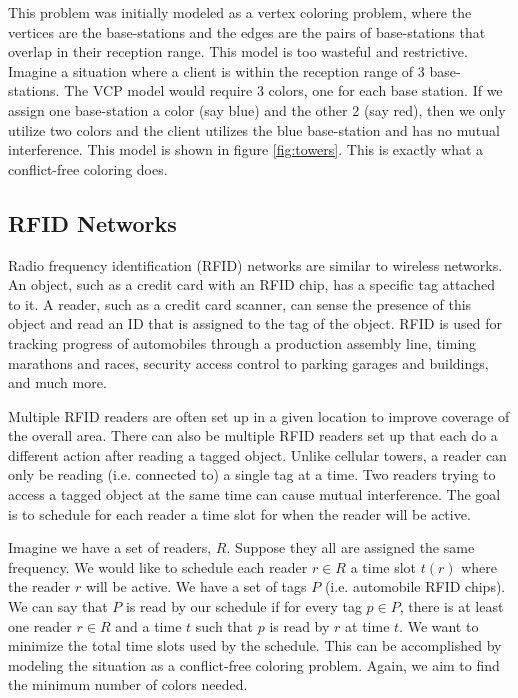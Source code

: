 \documentclass{sig-alternate}
\begin{document}
This problem was initially modeled as a vertex coloring problem, where the vertices are the base-stations and the edges are the pairs of base-stations that overlap in their reception range. This model is too wasteful and restrictive. Imagine a situation where a client is within the reception range of 3 base-stations. The VCP model would require 3 colors, one for each base station. If we assign one base-station a color (say blue) and the other 2 (say red), then we only utilize two colors and the client utilizes the blue base-station and has no mutual interference. This model is shown in figure \ref{fig:towers}. This is exactly what a conflict-free coloring does. \cite{smorodinsky2013conflict}

\subsection{RFID Networks}
Radio frequency identification (RFID) networks are similar to wireless networks. An object, such as a credit card with an RFID chip, has a specific tag attached to it. A reader, such as a credit card scanner, can sense the presence of this object and read an ID that is assigned to the tag of the object. RFID is used for tracking progress of automobiles through a production assembly line, timing marathons and races, security access control to parking garages and buildings, and much more.

Multiple RFID readers are often set up in a given location to improve coverage of the overall area. There can also be multiple RFID readers set up that each do a different action after reading a tagged object. Unlike cellular towers, a reader can only be reading (i.e. connected to) a single tag at a time. Two readers trying to access a tagged object at the same time can cause mutual interference. The goal is to schedule for each reader a time slot for when the reader will be active.

Imagine we have a set of readers, $R$. Suppose they all are assigned the same frequency. We would like to schedule each reader $r \in R$ a time slot $t(r)$ where the reader $r$ will be active. We have a set of tags $P$ (i.e. automobile RFID chips). We can say that $P$ is read by our schedule if for every tag $p \in P$, there is at least one reader $r \in R$ and a time $t$ such that $p$ is read by $r$ at time $t$. We want to minimize the total time slots used by the schedule. This can be accomplished by modeling the situation as a conflict-free coloring problem. Again, we aim to find the minimum number of colors needed. \cite{cheilaris2014strong, smorodinsky2013conflict}
\end{document}
